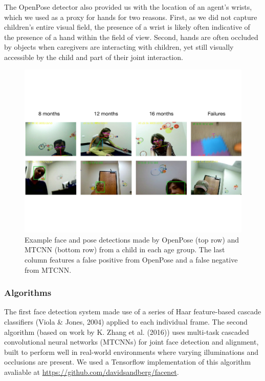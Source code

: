 \documentclass[10pt, letterpaper]{article}
\begin{document}
The OpenPose detector also provided us with the location of an agent's
wrists, which we used as a proxy for hands for two reasons. First, as we
did not capture children's entire visual field, the presence of a wrist
is likely often indicative of the presence of a hand within the field of
view. Second, hands are often occluded by objects when caregivers are
interacting with children, yet still visually accessible by the child
and part of their joint interaction.

\begin{figure}
\centering
\includegraphics[width=5.5in]{images/detector_samples_banner.pdf}
\caption{\label{fig:frames} Example face and pose detections made by OpenPose (top row) and MTCNN (bottom row) from a child in each age group. The last column features a false positive from OpenPose and a false negative from MTCNN.}
\end{figure}

\subsubsection{Algorithms}\label{algorithms}

The first face detection system made use of a series of Haar
feature-based cascade classifiers (Viola \& Jones, 2004) applied to each
individual frame. The second algorithm (based on work by K. Zhang et al.
(2016)) uses multi-task cascaded convolutional neural networks (MTCNNs)
for joint face detection and alignment, built to perform well in
real-world environments where varying illuminations and occlusions are
present. We used a Tensorflow implementation of this algorithm avaliable
at \url{https://github.com/davidsandberg/facenet}.
\end{document}
